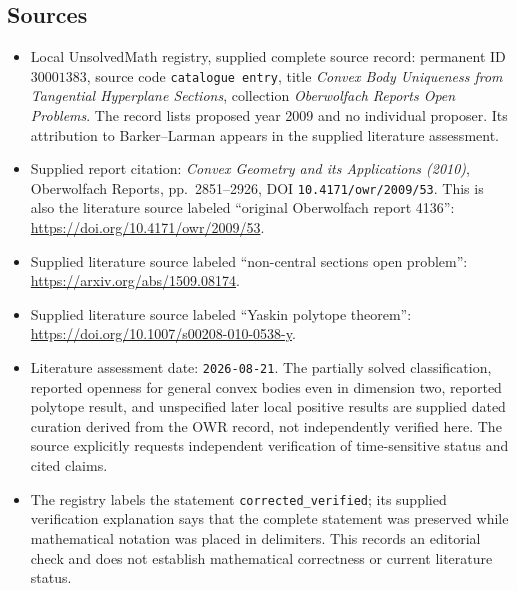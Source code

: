 \documentclass[11pt]{article}
\begin{document}
\subsection{Sources}
\begin{itemize}
\item Local UnsolvedMath registry, supplied complete source record: permanent ID \(30001383\), source code \texttt{catalogue entry}, title \emph{Convex Body Uniqueness from Tangential Hyperplane Sections}, collection \emph{Oberwolfach Reports Open Problems}. The record lists proposed year 2009 and no individual proposer. Its attribution to Barker--Larman appears in the supplied literature assessment.
\item Supplied report citation: \emph{Convex Geometry and its Applications (2010)}, Oberwolfach Reports, pp.\ 2851--2926, DOI \texttt{10.4171/owr/2009/53}. This is also the literature source labeled ``original Oberwolfach report 4136'': \url{https://doi.org/10.4171/owr/2009/53}.
\item Supplied literature source labeled ``non-central sections open problem'': \url{https://arxiv.org/abs/1509.08174}.
\item Supplied literature source labeled ``Yaskin polytope theorem'': \url{https://doi.org/10.1007/s00208-010-0538-y}.
\item Literature assessment date: \texttt{2026-08-21}. The partially solved classification, reported openness for general convex bodies even in dimension two, reported polytope result, and unspecified later local positive results are supplied dated curation derived from the OWR record, not independently verified here. The source explicitly requests independent verification of time-sensitive status and cited claims.
\item The registry labels the statement \texttt{corrected\_verified}; its supplied verification explanation says that the complete statement was preserved while mathematical notation was placed in delimiters. This records an editorial check and does not establish mathematical correctness or current literature status.
\end{itemize}
\end{document}
